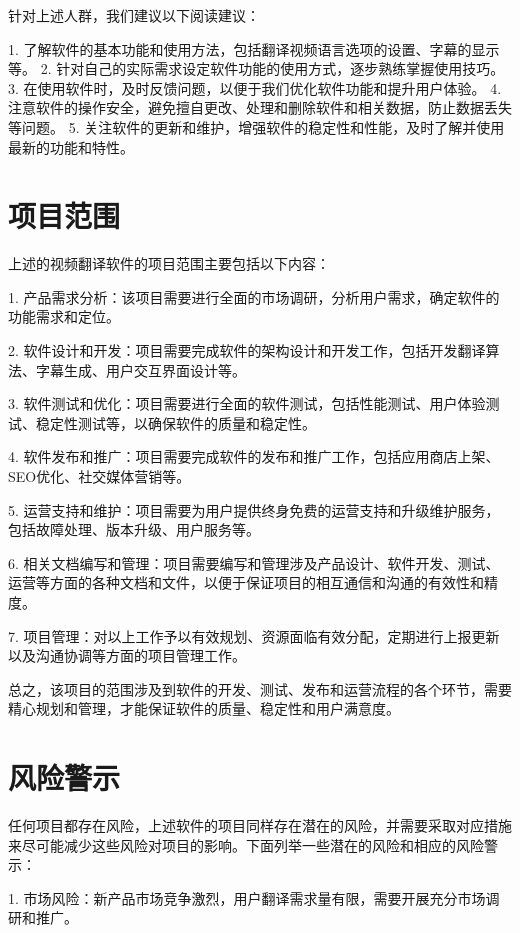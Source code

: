 针对上述人群，我们建议以下阅读建议：

1. 了解软件的基本功能和使用方法，包括翻译视频语言选项的设置、字幕的显示等。
2. 针对自己的实际需求设定软件功能的使用方式，逐步熟练掌握使用技巧。
3. 在使用软件时，及时反馈问题，以便于我们优化软件功能和提升用户体验。
4. 注意软件的操作安全，避免擅自更改、处理和删除软件和相关数据，防止数据丢失等问题。
5. 关注软件的更新和维护，增强软件的稳定性和性能，及时了解并使用最新的功能和特性。

\section{项目范围}

    上述的视频翻译软件的项目范围主要包括以下内容：
    
    1. 产品需求分析：该项目需要进行全面的市场调研，分析用户需求，确定软件的功能需求和定位。
    
    2. 软件设计和开发：项目需要完成软件的架构设计和开发工作，包括开发翻译算法、字幕生成、用户交互界面设计等。
    
    3. 软件测试和优化：项目需要进行全面的软件测试，包括性能测试、用户体验测试、稳定性测试等，以确保软件的质量和稳定性。
    
    4. 软件发布和推广：项目需要完成软件的发布和推广工作，包括应用商店上架、SEO优化、社交媒体营销等。
    
    5. 运营支持和维护：项目需要为用户提供终身免费的运营支持和升级维护服务，包括故障处理、版本升级、用户服务等。
    
    6. 相关文档编写和管理：项目需要编写和管理涉及产品设计、软件开发、测试、运营等方面的各种文档和文件，以便于保证项目的相互通信和沟通的有效性和精度。
    
    7. 项目管理：对以上工作予以有效规划、资源面临有效分配，定期进行上报更新以及沟通协调等方面的项目管理工作。

   总之，该项目的范围涉及到软件的开发、测试、发布和运营流程的各个环节，需要精心规划和管理，才能保证软件的质量、稳定性和用户满意度。

\section{风险警示}

任何项目都存在风险，上述软件的项目同样存在潜在的风险，并需要采取对应措施来尽可能减少这些风险对项目的影响。下面列举一些潜在的风险和相应的风险警示：

1. 市场风险：新产品市场竞争激烈，用户翻译需求量有限，需要开展充分市场调研和推广。

